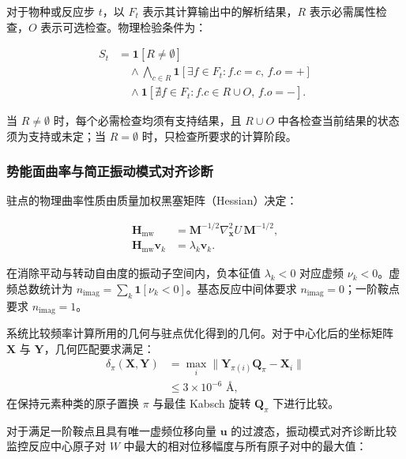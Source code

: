 对于物种或反应步 $t$，以 $F_t$ 表示其计算输出中的解析结果，$R$ 表示必需属性检查，$O$ 表示可选检查。物理检验条件为：

\begin{equation}\label{eq:methods-09}
\begin{aligned}
S_t&=\mathbf{1}[R\ne\emptyset]\\
&\quad{}\wedge\bigwedge_{c\in R}\mathbf{1}[\exists f\in F_t:f.c=c,\,f.o=+]\\
&\quad{}\wedge\mathbf{1}[\nexists f\in F_t:f.c\in R\cup O,\,f.o=-].
\end{aligned}
\end{equation}

当 $R\ne\emptyset$ 时，每个必需检查均须有支持结果，且 $R\cup O$ 中各检查当前结果的状态须为支持或未定；当 $R=\emptyset$ 时，只检查所要求的计算阶段。

\subsubsection{势能面曲率与简正振动模式对齐诊断}
驻点的物理曲率性质由质量加权黑塞矩阵（Hessian）决定：

\begin{equation}\label{eq:methods-10}
\begin{aligned}
\mathbf{H}_{\mathrm{mw}}&=\mathbf{M}^{-1/2}\nabla_{\mathbf{x}}^2 U\,\mathbf{M}^{-1/2},\\
\mathbf{H}_{\mathrm{mw}}\mathbf{v}_k&=\lambda_k\mathbf{v}_k.
\end{aligned}
\end{equation}

在消除平动与转动自由度的振动子空间内，负本征值 $\lambda_k<0$ 对应虚频 $\nu_k<0$。虚频总数统计为 $n_{\mathrm{imag}}=\sum_k \mathbf{1}[\nu_k<0]$。基态反应中间体要求 $n_{\mathrm{imag}}=0$；一阶鞍点要求 $n_{\mathrm{imag}}=1$。

系统比较频率计算所用的几何与驻点优化得到的几何。对于中心化后的坐标矩阵 $\mathbf{X}$ 与 $\mathbf{Y}$，几何匹配要求满足：
\[
\begin{aligned}
\delta_\pi(\mathbf{X},\mathbf{Y})
&=\max_i\|\mathbf{Y}_{\pi(i)}\mathbf{Q}_\pi-\mathbf{X}_i\|\\
&\le 3\times 10^{-6}\text{ Å},
\end{aligned}
\]
在保持元素种类的原子置换 $\pi$ 与最佳 Kabsch 旋转 $\mathbf{Q}_\pi$ 下进行比较。

对于满足一阶鞍点且具有唯一虚频位移向量 $\mathbf{u}$ 的过渡态，振动模式对齐诊断比较监控反应中心原子对 $W$ 中最大的相对位移幅度与所有原子对中的最大值：

